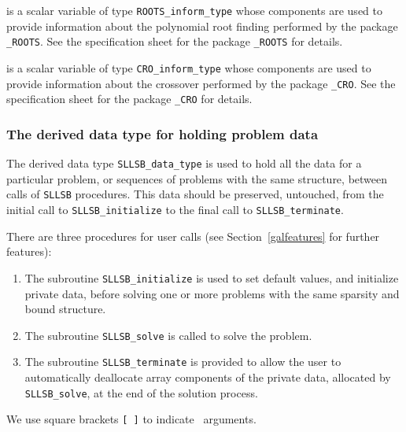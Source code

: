 \documentclass{galahad}
\newcommand{\packagename}{SLLSB}
\begin{document}
\begin{description}
 is a scalar variable of type
{\tt ROOTS\_inform\_type}
whose components are used to provide information about the
polynomial root finding performed by the package
{\tt \libraryname\_ROOTS}.
See the specification sheet for the package
{\tt \libraryname\_ROOTS} for details.

 is a scalar variable of type
{\tt CRO\_inform\_type}
whose components are used to provide information about the crossover
performed by the package
{\tt \libraryname\_CRO}.
See the specification sheet for the package
{\tt \libraryname\_CRO} for details.

\end{description}



\subsubsection{The derived data type for holding problem data}\label{typedata}
The derived data type
{\tt \packagename\_data\_type}
is used to hold all the data for a particular problem,
or sequences of problems with the same structure, between calls of
{\tt \packagename} procedures.
This data should be preserved, untouched, from the initial call to
{\tt \packagename\_initialize}
to the final call to
{\tt \packagename\_terminate}.


\galarguments
There are three procedures for user calls
(see Section~\ref{galfeatures} for further features):

\begin{enumerate}
\item The subroutine
      {\tt \packagename\_initialize}
      is used to set default values, and initialize private data,
      before solving one or more problems with the
      same sparsity and bound structure.
\item The subroutine
      {\tt \packagename\_solve}
      is called to solve the problem.
\item The subroutine
      {\tt \packagename\_terminate}
      is provided to allow the user to automatically deallocate array
       components of the private data, allocated by
       {\tt \packagename\_solve},
       at the end of the solution process.
\end{enumerate}
We use square brackets {\tt [ ]} to indicate \optional\ arguments.
\end{document}
